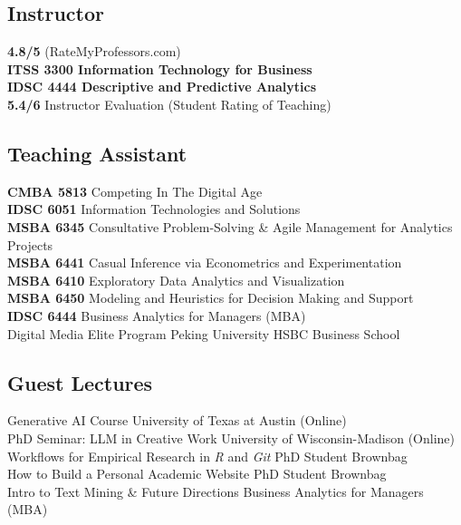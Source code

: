 \documentclass[11pt]{article} %
\newcommand{\ind}{\leavevmode{\parindent=1em\indent}}
\begin{document}
\subsection*{Instructor}
\textbf{4.8/5} (RateMyProfessors.com)\\
 \textbf{ITSS 3300 Information Technology for Business} \\
 \textbf{IDSC 4444 Descriptive and Predictive Analytics} \\
\ind \textbf{5.4/6} Instructor Evaluation (Student Rating of Teaching)

\subsection*{Teaching Assistant}
 \textbf{CMBA 5813} Competing In The Digital Age \\
 \textbf{IDSC 6051} Information Technologies and Solutions \\
 \textbf{MSBA 6345} Consultative Problem-Solving \& Agile Management for Analytics Projects \\
 \textbf{MSBA 6441} Casual Inference via Econometrics and Experimentation \\
 \textbf{MSBA 6410} Exploratory Data Analytics and Visualization \\
 \textbf{MSBA 6450} Modeling and Heuristics for Decision Making and Support \\
 \textbf{IDSC 6444} Business Analytics for Managers (MBA) \\
 Digital Media Elite Program \hfill Peking University HSBC Business School

\subsection*{Guest Lectures}
 Generative AI Course \hfill University of Texas at Austin (Online) \\
 PhD Seminar: LLM in Creative Work \hfill University of Wisconsin-Madison (Online) \\
 Workflows for Empirical Research in \textit{R} and \textit{Git} \hfill PhD Student Brownbag \\
 How to Build a Personal Academic Website \hfill PhD Student Brownbag \\
 Intro to Text Mining \& Future Directions \hfill Business Analytics for Managers (MBA)
\end{document}
